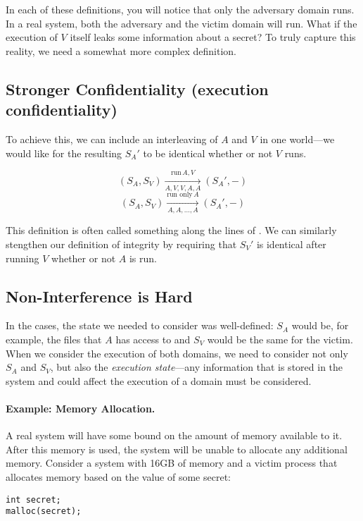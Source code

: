 In each of these definitions, you will notice that only the adversary domain runs. In a real system, both the adversary and the victim domain will run. What if the execution of $V$ itself leaks some information about a secret? To truly capture this reality, we need a somewhat more complex definition.

\subsection{Stronger Confidentiality (execution confidentiality)}
To achieve this, we can include an interleaving of $A$ and $V$ in one world---we would like for the resulting $S_A'$ to be identical whether or not $V$ runs.

\[ (S_A, S_V) \xrightarrow[A, V, V, A, A]{\text{run}\, A, V} (S_A', -) \]
\[ (S_A, S_V) \xrightarrow[A, A, \ldots, A]{\text{run only}\, A} (S_A', -) \]

This definition is often called something along the lines of . We can similarly stengthen our definition of integrity by requiring that $S_V'$ is identical after running $V$ whether or not $A$ is run.

\subsection{Non-Interference is Hard}
In the  cases, the state we needed to consider was well-defined: $S_A$ would be, for example, the files that $A$ has access to and $S_V$ would be the same for the victim. When we consider the execution of both domains, we need to consider not only $S_A$ and $S_V$, but also the \emph{execution state}---any information that is stored in the system and could affect the execution of a domain must be considered.

\paragraph{Example: Memory Allocation.} A real system will have some bound on the amount of memory available to it. After this memory is used, the system will be unable to allocate any additional memory. Consider a system with 16GB of memory and a victim process that allocates memory based on the value of some secret:

\begin{lstlisting}
int secret;
malloc(secret);
\end{lstlisting}


